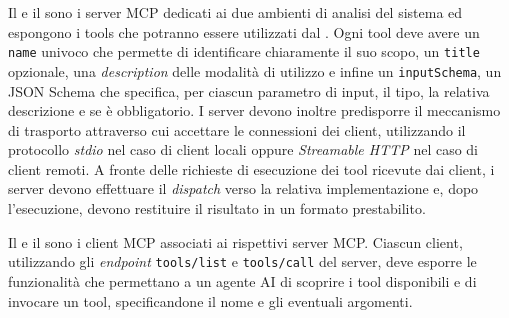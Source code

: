Il \sremcpserver{} e il \sandmcpserver{} sono i server MCP dedicati ai due ambienti di analisi del sistema ed espongono i tools che potranno essere utilizzati dal \sreagent{}.  Ogni tool \cite{anthropic2024mcp} deve avere un \texttt{name} univoco che permette di identificare chiaramente il suo scopo, un \texttt{title} opzionale, una \emph{description} delle modalità di utilizzo e infine un \texttt{inputSchema}, un JSON Schema che specifica, per ciascun parametro di input, il tipo, la relativa descrizione e se è obbligatorio. I server devono inoltre predisporre il meccanismo di trasporto attraverso cui accettare le connessioni dei client, utilizzando il protocollo \emph{stdio} nel caso di client locali oppure \emph{Streamable HTTP} nel caso di client remoti. A fronte delle richieste di esecuzione dei tool ricevute dai client, i server devono effettuare il \emph{dispatch} verso la relativa implementazione e, dopo l'esecuzione, devono restituire il risultato in un formato prestabilito.



Il \sremcpclient{} e il \sandmcpclient{} sono i client MCP associati ai rispettivi server MCP. Ciascun client, utilizzando gli \emph{endpoint} \texttt{tools/list} e \texttt{tools/call} del server, deve esporre le funzionalità che permettano a un agente AI di scoprire i tool disponibili e di invocare un tool, specificandone il nome e gli eventuali argomenti. %




